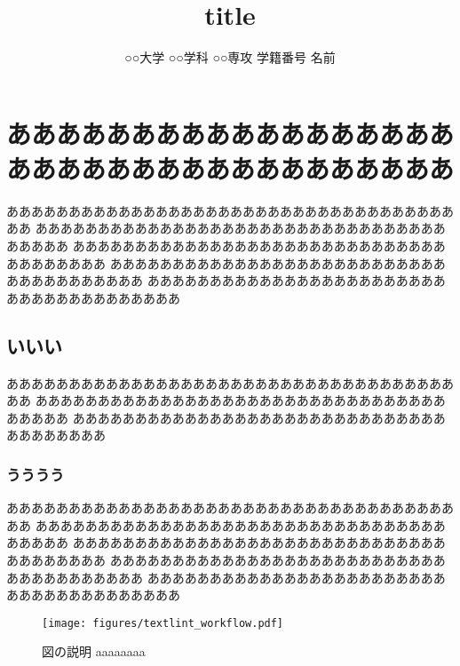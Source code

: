 \documentclass{classes/resume}
\title{
	title
}
\author{
	○○大学 ○○学科 ○○専攻 学籍番号 名前
}
\begin{document}
\maketitle

\section{ああああああああああああああああああああああああああああああああああああ}
ああああああああああああああああああああああああああああああああああああああ
ああああああああああああああああああああああああああああああああああああああ
ああああああああああああああああああああああああああああああああああああああ
ああああああああああああああああああああああああああああああああああああああ
ああああああああああああああああああああああああああああああああああああああ
\subsection{いいい}
ああああああああああああああああああああああああああああああああああああああ
ああああああああああああああああああああああああああああああああああああああ
ああああああああああああああああああああああああああああああああああああああ
\subsubsection{うううう}
ああああああああああああああああああああああああああああああああああああああ
ああああああああああああああああああああああああああああああああああああああ
ああああああああああああああああああああああああああああああああああああああ
ああああああああああああああああああああああああああああああああああああああ
ああああああああああああああああああああああああああああああああああああああ

\begin{figure}[htbp]
    \centering
    \texttt{[image: figures/textlint\_workflow.pdf]}
    \caption{図の説明 aaaaaaaa\cite{ref:nomura2022uwb}\cite{ref:青空文庫Aozo22:online}}
    \label{fig:fig1}
\end{figure}
\end{document}
